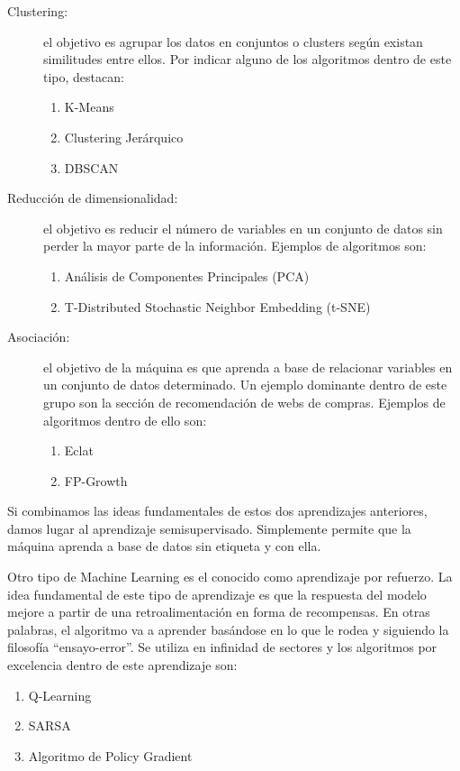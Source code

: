 	\begin{description}
		\item[Clustering:] el objetivo es agrupar los datos en conjuntos o clusters según existan similitudes entre ellos. Por indicar alguno de los algoritmos dentro de este tipo, destacan:
			\begin{enumerate}
				\item K-Means
				\item Clustering Jerárquico
				\item DBSCAN
			\end{enumerate}
		\item[Reducción de dimensionalidad:] el objetivo es reducir el número de variables en un conjunto de datos sin perder la mayor parte de la información. Ejemplos de algoritmos son:
			\begin{enumerate}
				\item Análisis de Componentes Principales (PCA)
				\item T-Distributed Stochastic Neighbor Embedding (t-SNE)
			\end{enumerate}
		\item[Asociación:] el objetivo de la máquina es que aprenda a base de relacionar variables en un conjunto de datos determinado. Un ejemplo dominante dentro de este grupo son la sección de recomendación de webs de compras. Ejemplos de algoritmos dentro de ello son:
			\begin{enumerate}
				\item Eclat
				\item FP-Growth
			\end{enumerate}
	\end{description}

	Si combinamos las ideas fundamentales de estos dos aprendizajes anteriores, damos lugar al aprendizaje semisupervisado. Simplemente permite que la máquina aprenda a base de datos sin etiqueta y con ella.
	
	Otro tipo de Machine Learning es el conocido como aprendizaje por refuerzo. La idea fundamental de este tipo de aprendizaje es que la respuesta del modelo mejore a partir de una retroalimentación en forma de recompensas. En otras palabras, el algoritmo va a aprender basándose en lo que le rodea y siguiendo la filosofía “ensayo-error”. Se utiliza en infinidad de sectores y los algoritmos por excelencia dentro de este aprendizaje son:
			\begin{enumerate}
				\item Q-Learning
				\item SARSA
				\item Algoritmo de Policy Gradient
			\end{enumerate}
	
